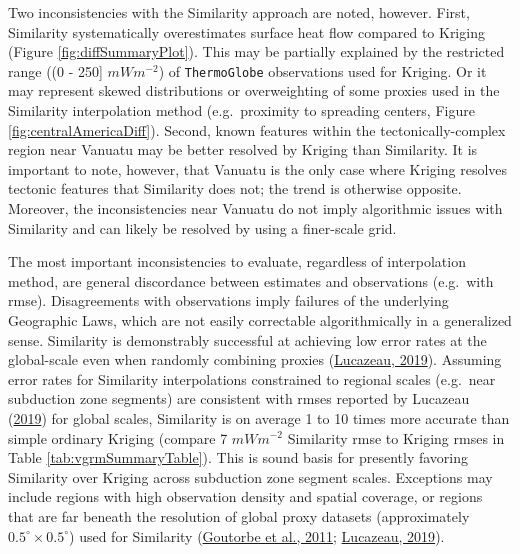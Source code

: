 Two inconsistencies with the Similarity approach are noted, however. First, Similarity systematically overestimates surface heat flow compared to Kriging (Figure \ref{fig:diffSummaryPlot}). This may be partially explained by the restricted range ((0 - 250{]} \(mWm^{-2}\)) of \texttt{ThermoGlobe} observations used for Kriging. Or it may represent skewed distributions or overweighting of some proxies used in the Similarity interpolation method (e.g.~proximity to spreading centers, Figure \ref{fig:centralAmericaDiff}). Second, known features within the tectonically-complex region near Vanuatu may be better resolved by Kriging than Similarity. It is important to note, however, that Vanuatu is the only case where Kriging resolves tectonic features that Similarity does not; the trend is otherwise opposite. Moreover, the inconsistencies near Vanuatu do not imply algorithmic issues with Similarity and can likely be resolved by using a finer-scale grid.

The most important inconsistencies to evaluate, regardless of interpolation method, are general discordance between estimates and observations (e.g.~with \gls{rmse}). Disagreements with observations imply failures of the underlying Geographic Laws, which are not easily correctable algorithmically in a generalized sense. Similarity is demonstrably successful at achieving low error rates at the global-scale even when randomly combining proxies (\protect\hyperlink{ref-lucazeau2019}{Lucazeau, 2019}). Assuming error rates for Similarity interpolations constrained to regional scales (e.g.~near subduction zone segments) are consistent with \glspl{rmse} reported by Lucazeau (\protect\hyperlink{ref-lucazeau2019}{2019}) for global scales, Similarity is on average 1 to 10 times more accurate than simple ordinary Kriging (compare 7 \(mWm^{-2}\) Similarity \gls{rmse} to Kriging \glspl{rmse} in Table \ref{tab:vgrmSummaryTable}). This is sound basis for presently favoring Similarity over Kriging across subduction zone segment scales. Exceptions may include regions with high observation density and spatial coverage, or regions that are far beneath the resolution of global proxy datasets (approximately \(0.5^\circ \times 0.5^\circ\)) used for Similarity (\protect\hyperlink{ref-goutorbe2011}{Goutorbe et al., 2011}; \protect\hyperlink{ref-lucazeau2019}{Lucazeau, 2019}).

